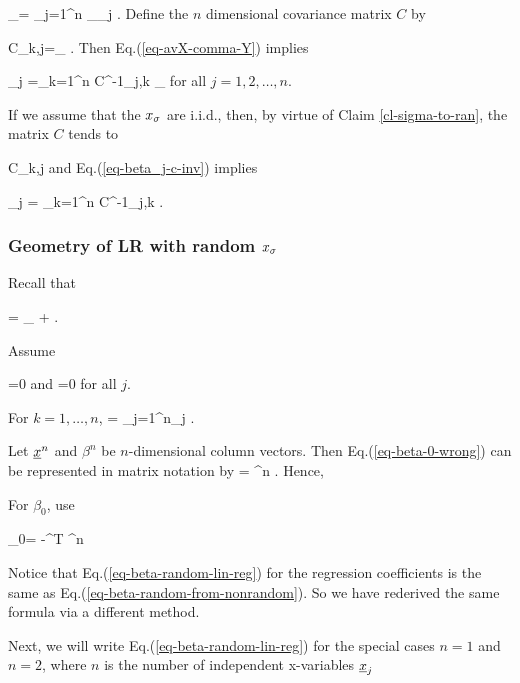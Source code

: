 \beq
{}_\s=
\sum_{j=1}^n
_\s \beta_j
\label{eq-avX-comma-Y}
\;.
\eeq
Define the $n$ dimensional
covariance matrix $C$
by

\beq
C_{k,j}=_\s
\:.
\eeq
Then Eq.(\ref{eq-avX-comma-Y}) implies

\beq
\beta_j =\sum_{k=1}^n
C^{-1}_{j,k} _\s
\label{eq-beta_j-c-inv}
\eeq
for all $j=1,2,\ldots, n$.

If we assume that the $x_\sigma$ are i.i.d.,
then, by  virtue of Claim \ref{cl-sigma-to-ran},
the matrix $C$ tends to


\beq
C_{k,j}
\rarrow {}
\eeq
and Eq.(\ref{eq-beta_j-c-inv})
implies

\beq
\beta_j = \sum_{k=1}^n C^{-1}_{j,k}
\label{eq-beta-random-from-nonrandom}
\;.
\eeq

\subsubsection{Geometry of LR with random $x_\sigma$}
Recall that

\beq
\rvy =
_{\HAT{\rvy}}
+\ul{\eps}
\;.
\eeq


Assume

\beq
\av{\rveps}=0
\eeq
and
\beq
{}=0
\eeq
for all $j$.

For $k=1, \ldots, n$,
\beq
{}
=
\sum_{j=1}^{n}\beta_j
\;.
\label{eq-beta-0-wrong}
\eeq

Let ${\underline{x}}^n$ and $\beta^n$ be
$n$-dimensional column vectors.
Then Eq.(\ref{eq-beta-0-wrong})
can be represented
 in matrix notation by
\beq
{}=
\beta^n
\;.
\eeq
Hence,

\beq
{}
\label{eq-beta-random-lin-reg}
\eeq
For $\beta_0$, use

\beq
\beta_0=
\av{\rvy}-^T \beta^n
\eeq

Notice that
Eq.(\ref{eq-beta-random-lin-reg})
for the regression coefficients
is the same
as Eq.(\ref{eq-beta-random-from-nonrandom}).
So we have rederived the same formula
via a different method.


Next, we will
write
 Eq.(\ref{eq-beta-random-lin-reg})
for the special cases
$n=1$ and $n=2$,
where $n$ is the
number of independent x-variables ${\underline{x}}_j$

